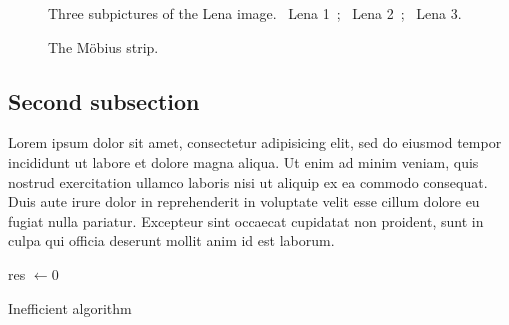 \setlength{\FigSpacing}{.04\textwidth}
\setlength{\FigWidth}{.20\textwidth}
\begin{figure}
  \centering
  \hspace{\FigSpacing}%
  \hspace{\FigSpacing}%
  \caption[Lena]{%
    Three subpictures of the Lena image. %
    ~Lena 1~; %
    ~Lena 2~; %
    ~Lena 3. %
  }%
  \label{fig:lena}
\end{figure}


\setlength{\FigSpacing}{.04\textwidth}
\setlength{\FigWidth}{.50\textwidth}
\begin{figure}
  \centering {}
  \caption[Möbius strip]{%
    The Möbius strip.%
  }%
  \label{fig:varietes}
\end{figure}

\subsection{Second subsection}
\label{sec:algo}

Lorem ipsum dolor sit amet, consectetur adipisicing elit, sed do
eiusmod tempor incididunt ut labore et dolore magna aliqua. Ut enim ad
minim veniam, quis nostrud exercitation ullamco laboris nisi ut
aliquip ex ea commodo consequat. Duis aute irure dolor in
reprehenderit in voluptate velit esse cillum dolore eu fugiat nulla
pariatur. Excepteur sint occaecat cupidatat non proident, sunt in
culpa qui officia deserunt mollit anim id est laborum.


\begin{algorithm2e}%
  res $\gets 0$\;
  \caption[Highly inefficient algorithm]{Inefficient algorithm}%
  \label{algo:sum}%
\end{algorithm2e}%

